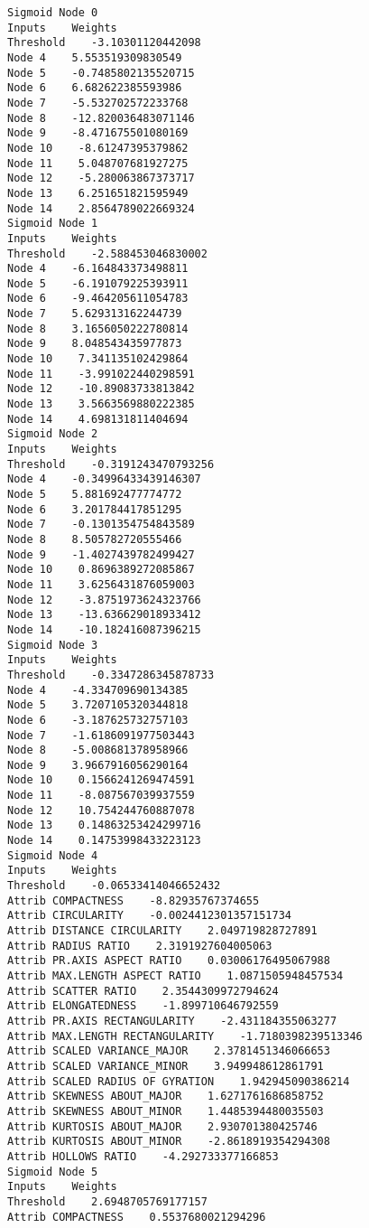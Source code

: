\documentclass[
	article,			%
	11pt,				%
	oneside,			%
	a4paper,			%
	english,			%
	brazil,				%
	sumario=tradicional
	]{abntex2}
\begin{document}
\begin{lstlisting}
Sigmoid Node 0
Inputs    Weights
Threshold    -3.10301120442098
Node 4    5.553519309830549
Node 5    -0.7485802135520715
Node 6    6.682622385593986
Node 7    -5.532702572233768
Node 8    -12.820036483071146
Node 9    -8.471675501080169
Node 10    -8.61247395379862
Node 11    5.048707681927275
Node 12    -5.280063867373717
Node 13    6.251651821595949
Node 14    2.8564789022669324
Sigmoid Node 1
Inputs    Weights
Threshold    -2.588453046830002
Node 4    -6.164843373498811
Node 5    -6.191079225393911
Node 6    -9.464205611054783
Node 7    5.629313162244739
Node 8    3.1656050222780814
Node 9    8.048543435977873
Node 10    7.341135102429864
Node 11    -3.991022440298591
Node 12    -10.89083733813842
Node 13    3.5663569880222385
Node 14    4.698131811404694
Sigmoid Node 2
Inputs    Weights
Threshold    -0.3191243470793256
Node 4    -0.34996433439146307
Node 5    5.881692477774772
Node 6    3.201784417851295
Node 7    -0.1301354754843589
Node 8    8.505782720555466
Node 9    -1.4027439782499427
Node 10    0.8696389272085867
Node 11    3.6256431876059003
Node 12    -3.8751973624323766
Node 13    -13.636629018933412
Node 14    -10.182416087396215
Sigmoid Node 3
Inputs    Weights
Threshold    -0.3347286345878733
Node 4    -4.334709690134385
Node 5    3.7207105320344818
Node 6    -3.187625732757103
Node 7    -1.6186091977503443
Node 8    -5.008681378958966
Node 9    3.9667916056290164
Node 10    0.1566241269474591
Node 11    -8.087567039937559
Node 12    10.754244760887078
Node 13    0.14863253424299716
Node 14    0.14753998433223123
Sigmoid Node 4
Inputs    Weights
Threshold    -0.06533414046652432
Attrib COMPACTNESS    -8.82935767374655
Attrib CIRCULARITY    -0.0024412301357151734
Attrib DISTANCE CIRCULARITY    2.049719828727891
Attrib RADIUS RATIO    2.3191927604005063
Attrib PR.AXIS ASPECT RATIO    0.03006176495067988
Attrib MAX.LENGTH ASPECT RATIO    1.0871505948457534
Attrib SCATTER RATIO    2.3544309972794624
Attrib ELONGATEDNESS    -1.899710646792559
Attrib PR.AXIS RECTANGULARITY    -2.431184355063277
Attrib MAX.LENGTH RECTANGULARITY    -1.7180398239513346
Attrib SCALED VARIANCE_MAJOR    2.3781451346066653
Attrib SCALED VARIANCE_MINOR    3.949948612861791
Attrib SCALED RADIUS OF GYRATION    1.942945090386214
Attrib SKEWNESS ABOUT_MAJOR    1.6271761686858752
Attrib SKEWNESS ABOUT_MINOR    1.4485394480035503
Attrib KURTOSIS ABOUT_MAJOR    2.930701380425746
Attrib KURTOSIS ABOUT_MINOR    -2.8618919354294308
Attrib HOLLOWS RATIO    -4.292733377166853
Sigmoid Node 5
Inputs    Weights
Threshold    2.6948705769177157
Attrib COMPACTNESS    0.5537680021294296

\end{lstlisting}
\end{document}
